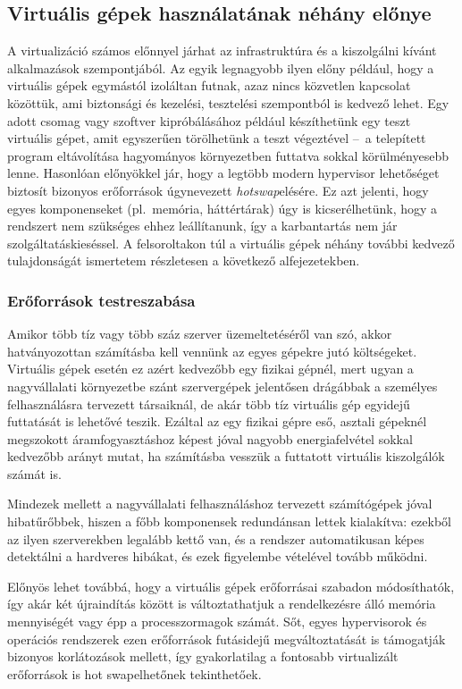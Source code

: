 \subsection{Virtuális gépek használatának néhány előnye}
A virtualizáció számos előnnyel járhat az infrastruktúra és a kiszolgálni kívánt alkalmazások szempontjából. Az egyik legnagyobb ilyen előny például, hogy a virtuális gépek egymástól izoláltan futnak, azaz nincs közvetlen kapcsolat közöttük, ami biztonsági és kezelési, tesztelési szempontból is kedvező lehet. Egy adott csomag vagy szoftver kipróbálásához például készíthetünk egy teszt virtuális gépet, amit egyszerűen törölhetünk a teszt végeztével --~a telepített program eltávolítása hagyományos környezetben futtatva sokkal körülményesebb lenne. Hasonlóan előnyökkel jár, hogy a legtöbb modern \gls{hypervisor} lehetőséget biztosít bizonyos erőforrások úgynevezett \textit{\gls{hotswap}}elésére. Ez azt jelenti, hogy egyes komponenseket (pl.~memória, háttértárak) úgy is kicserélhetünk, hogy a rendszert nem szükséges ehhez leállítanunk, így a karbantartás nem jár szolgáltatáskieséssel. A felsoroltakon túl a virtuális gépek néhány további kedvező tulajdonságát ismertetem részletesen a következő alfejezetekben.

\subsubsection{Erőforrások testreszabása}
Amikor több tíz vagy több száz szerver üzemeltetéséről van szó, akkor hatványozottan számításba kell vennünk az egyes gépekre jutó költségeket. Virtuális gépek esetén ez azért kedvezőbb egy fizikai gépnél, mert ugyan a nagyvállalati környezetbe szánt szervergépek jelentősen drágábbak a személyes felhasználásra tervezett társaiknál, de akár több tíz virtuális gép egyidejű futtatását is lehetővé teszik. Ezáltal az egy fizikai gépre eső, asztali gépeknél megszokott áramfogyasztáshoz képest jóval nagyobb energiafelvétel sokkal kedvezőbb arányt mutat, ha számításba vesszük a futtatott virtuális kiszolgálók számát is.

Mindezek mellett a nagyvállalati felhasználáshoz tervezett számítógépek jóval hibatűrőbbek, hiszen a főbb komponensek redundánsan lettek kialakítva: ezekből az ilyen szerverekben legalább kettő van, és a rendszer automatikusan képes detektálni a hardveres hibákat, és ezek figyelembe vételével tovább működni.

Előnyös lehet továbbá, hogy a virtuális gépek erőforrásai szabadon módosíthatók, így akár két újraindítás között is változtathatjuk a rendelkezésre álló memória mennyiségét vagy épp a processzormagok számát. Sőt, egyes \gls{hypervisor}ok és operációs rendszerek ezen erőforrások futásidejű megváltoztatását is támogatják bizonyos korlátozások mellett, így gyakorlatilag a fontosabb virtualizált erőforrások is hot swapelhetőnek tekinthetőek.


